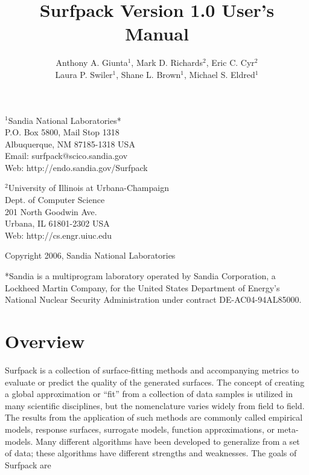 \documentclass{article}
\begin{document}
\title{Surfpack Version 1.0 User's Manual}

\author{Anthony A. Giunta$^1$, Mark D. Richards$^2$, Eric C. Cyr$^2$ \\Laura P. Swiler$^1$, Shane L. Brown$^1$, Michael S. Eldred$^1$}

\maketitle


\begin{center}
$^1$Sandia National Laboratories*\\P.O. Box 5800, Mail Stop 1318\\Albuquerque, NM 87185-1318 USA \\
Email: surfpack@scico.sandia.gov \\ Web: http://endo.sandia.gov/Surfpack
\end{center}

\bigbreak

\begin{center}
$^2$University of Illinois at Urbana-Champaign\\Dept. of Computer Science\\201 North Goodwin Ave.\\Urbana, IL 61801-2302 USA\\
Web: http://cs.engr.uiuc.edu
\end{center}

\bigbreak

\begin{center}
Copyright 2006, Sandia National Laboratories
\end{center}

\bigbreak

\begin{center}
*Sandia is a multiprogram laboratory operated by Sandia Corporation, a Lockheed Martin Company, 
for the United States Department of Energy's National Nuclear Security Administration under 
contract DE-AC04-94AL85000.
\end{center}







\pagebreak



\section {Overview}\label{sec:overview}
Surfpack is a collection of surface-fitting methods and accompanying metrics to evaluate or predict the quality of the generated surfaces.  The concept of creating a global approximation or ``fit'' from a collection of data samples is utilized in many scientific disciplines, but the nomenclature varies widely from field to field.  The results from the application of such methods are commonly called empirical models, response surfaces, surrogate models, function approximations, or meta-models.  Many different algorithms have been developed to generalize from a set of data; these algorithms have different strengths and weaknesses.  The goals of Surfpack are
\end{document}
